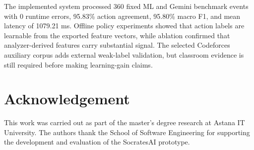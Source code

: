 \documentclass[twoside, 11pt]{article}
\begin{document}
The implemented system processed 360 fixed ML and Gemini benchmark events with 0 runtime errors, 95.83\% action agreement, 95.80\% macro F1, and mean latency of 1079.21 ms. Offline policy experiments showed that action labels are learnable from the exported feature vectors, while ablation confirmed that analyzer-derived features carry substantial signal. The selected Codeforces auxiliary corpus adds external weak-label validation, but classroom evidence is still required before making learning-gain claims.

\section*{\large Acknowledgement}

This work was carried out as part of the master's degree research at Astana IT University. The authors thank the School of Software Engineering for supporting the development and evaluation of the SocratesAI prototype.
\end{document}
